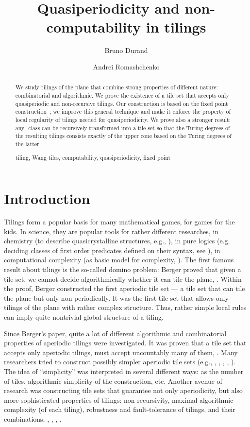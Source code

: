 \documentclass[runningheads]{llncs}
\title{Quasiperiodicity and non-computability in tilings}
\author{Bruno Durand\inst{1}\and Andrei Romashchenko\inst{1,2}}
\institute{LIRMM, Univ. Montpellier \& CNRS
\and
On leave from IITP RAS
}
\newcommand{\keywords}[1]{\par\addvspace\baselineskip
\noindent\keywordname\enspace\ignorespaces#1}
\begin{document}
\maketitle

\begin{abstract}
We study tilings of the plane that combine strong properties of  different nature: combinatorial and algorithmic.  
We  prove the existence of a tile set that accepts only quasiperiodic and non-recursive tilings. Our construction is based on the fixed point construction~\cite{drs}; we improve this general technique  and make it enforce the property of local regularity of tilings  needed for quasiperiodicity. 
We prove also a stronger result:  any  -class can be recursively transformed into a tile set so that the Turing degrees of the resulting tilings consists exactly of the upper cone based on the Turing degrees of the latter. 


 \keywords{tiling, Wang tiles, computability, quasiperiodicity,  fixed point}
\end{abstract}


\section{Introduction}

Tilings form a popular basis for many mathematical games, for games for the kids. In science, they are popular tools for rather different researches, in chemistry (to describe quasicrystalline structures, e.g., \cite{levitov}), in pure logics (e.g. deciding classes of first order predicates defined on their syntax, see \cite{gurevitch}), in computational complexity (as basic model for complexity, \cite{boas}). The first famous result about tilings is the so-called domino problem: Berger proved that given a tile set, we cannot decide algorithmically whether  it can tile the plane,  \cite{berger}. Within the proof, Berger constructed the first aperiodic tile set --- a tile set that can tile the plane but only non-periodically.  It was  the first  tile set that allows only  tilings of the plane with rather complex structure.  Thus, rather simple local rules can imply quite nontrivial global structure of a tiling.

Since Berger's paper, quite a lot of different algorithmic and combinatorial properties of aperiodic tilings were investigated. It was proven that  a tile set that accepts only aperiodic tilings, must accept uncountably many of them, \cite{bruno}. Many researchers  tried to construct  possibly simpler aperiodic tile sets (e.g., \cite{robinson}, \cite{gs}, \cite{kari}, \cite{ollinger}, \cite{drs}). The idea of ``simplicity'' was interpreted in several different ways: as the number of tiles, algorithmic simplicity of the construction, etc. Another avenue of research was constructing tile sets that guarantee not only aperiodicity, but also  more sophisticated  properties  of tilings: non-recursivity, maximal algorithmic complexity (of each tiling), robustness and fault-tolerance of tilings, and their combinations, \cite{nonrecursive1}, \cite{nonrecursive2}, \cite{dls}, \cite{drs}. 
\end{document}
